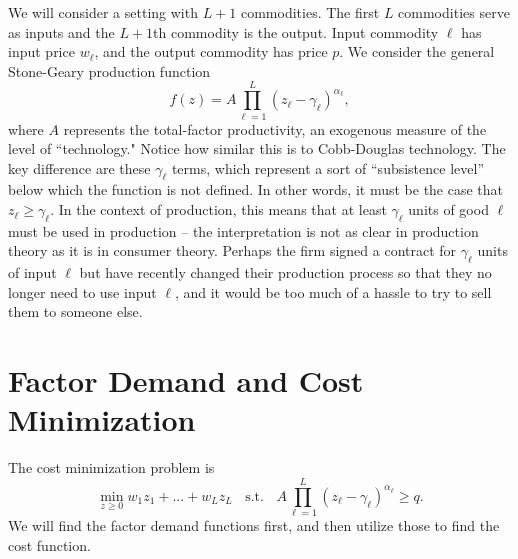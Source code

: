 \documentclass[12pt]{article}
\theoremstyle{definition}
\begin{document}
\maketitle
\singlespace


We will consider a setting with $L+1$ commodities. The first $L$ commodities serve as inputs and the $L+1$th commodity is the output. Input commodity $\ell$ has input price $w_{\ell}$, and the output commodity has price $p$. We consider the general Stone-Geary production function
	\[	f(z)=A \prod_{{\ell}=1}^L (z_{\ell} - \gamma_{\ell})^{\alpha_{\ell}},\]
where $A$ represents the total-factor productivity, an exogenous measure of the level of ``technology." Notice how similar this is to Cobb-Douglas technology. The key difference are these $\gamma_{\ell}$ terms, which represent a sort of ``subsistence level'' below which the function is not defined.  In other words, it must be the case that $z_{\ell} \geq \gamma_{\ell}$. In the context of production, this means that at least $\gamma_{\ell}$ units of good ${\ell}$ must be used in production -- the interpretation is not as clear in production theory as it is in consumer theory. Perhaps the firm signed a contract for $\gamma_{\ell}$ units of input ${\ell}$ but have recently changed their production process so that they no longer need to use input $\ell$, and it would be too much of a hassle to try to sell them to someone else.



\section{Factor Demand and Cost Minimization}
The cost minimization problem is
	\[	\min_{z \geq 0} w_1z_1 + ... + w_{L}z_{L}  \;\; \text{ s.t. } \;\; A \prod_{\ell = 1}^{L} (z_{\ell} - \gamma_{\ell})^{\alpha_{\ell}} \geq q. \]	
We will find the factor demand functions first, and then utilize those to find the cost function. 
	

	
\end{document}
